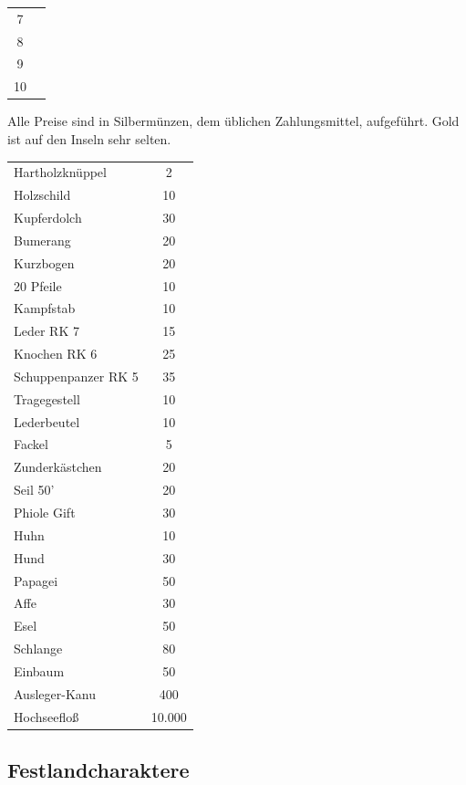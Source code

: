 \documentclass[11pt]{wbzine}
\begin{document}
\begin{multicols}{2}
\begin{tabularx}{\columnwidth}{cZ}
7 &
\\

8 &
\\

9 &
\\

10 &
\\

\end{tabularx}

Alle Preise sind in Silbermünzen, dem üblichen Zahlungsmittel,
aufgeführt. Gold ist auf den Inseln sehr selten.

\begin{tabularx}{\columnwidth}{Zc}
    Hartholzknüppel & 2\\
    Holzschild     & 10\\
    Kupferdolch     &30\\
    Bumerang        &20\\
    Kurzbogen       &20\\
    20 Pfeile       &10\\
    Kampfstab       &10\\
    Leder RK 7           &   15\\
    Knochen RK 6            &25\\
    Schuppenpanzer RK 5     &35\\
    Tragegestell    &10\\
    Lederbeutel     &10\\
    Fackel         & 5\\
    Zunderkästchen  &20\\
    Seil 50'        &20\\
    Phiole Gift     &30\\
    Huhn         &10\\
    Hund            & 30\\
    Papagei          &50\\
    Affe          &30\\
    Esel          &50\\
    Schlange         &  80\\
    Einbaum         &50\\
    Ausleger-Kanu   &400\\
    Hochseefloß      &10.000\\
\end{tabularx}

\subsection{Festlandcharaktere}
    

\end{multicols}
\end{document}
